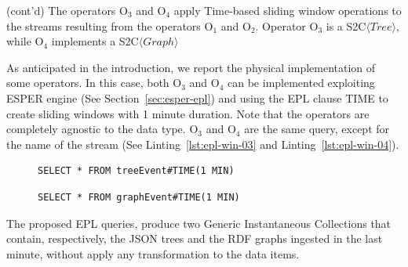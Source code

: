 \begin{Example}
(cont'd) The operators O$_3$ and O$_4$ apply Time-based sliding window operations to the streams resulting from the operators O$_1$ and O$_2$.
Operator O$_3$ is a S2C$\langle Tree \rangle$, while O$_4$ implements a S2C$\langle Graph \rangle$

As anticipated in the introduction, we report the physical implementation of some operators. 
In this case, both O$_3$ and O$_4$ can be implemented exploiting ESPER engine (See Section~\ref{sec:esper-epl}) and using the EPL clause TIME to create sliding windows with 1 minute duration.
Note that the operators are completely agnostic to the data type. O$_3$ and O$_4$ are the same query, except for the name of the stream (See Linting~\ref{lst:epl-win-03} and Linting~\ref{lst:epl-win-04}).

\begin{figure}[ht]
\begin{minipage}{0.95\linewidth}
\begin{lstlisting}[caption={EPL query, applied by O$_3$ operator, to window the stream of JSON trees},label=lst:epl-win-03,style=ESPER]
     SELECT * FROM treeEvent#TIME(1 MIN) 
\end{lstlisting}
\end{minipage}
\end{figure}

\begin{figure}[ht]
\begin{minipage}{0.95\linewidth}
\begin{lstlisting}[caption={EPL query, applied by O$_4$ operator, to window the stream of RDF graphs},label=lst:epl-win-04,style=ESPER]
     SELECT * FROM graphEvent#TIME(1 MIN) 
\end{lstlisting}
\end{minipage}
\end{figure}

The proposed EPL queries, produce two Generic Instantaneous Collections that contain, respectively, the JSON trees and the RDF graphs ingested in the last minute, without apply any transformation to the data items.


\end{Example}
